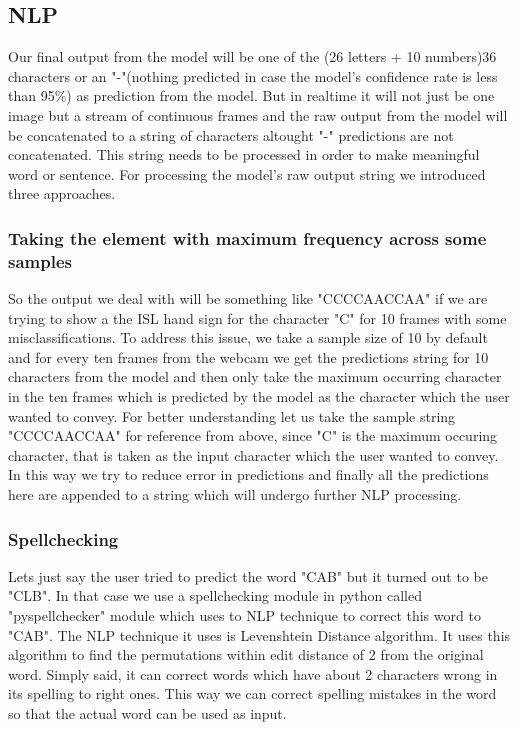 \documentclass[12pt,a4paper]{report}
\begin{document}
\subsection{NLP}
Our final output from the model will be one of the (26 letters + 10 numbers)36 characters or an "-"(nothing predicted in case the model's confidence rate is less than 95\%) as prediction from the model. But in realtime it will not just be one image but a stream of continuous frames and the raw output from the model will be concatenated to a string of characters altought "-" predictions are not concatenated. This string needs to be processed in order to make meaningful word or sentence. For processing the model's raw output string we introduced three approaches.

\subsubsection{Taking the element with maximum frequency across some samples}
So the output we deal with will be something like "CCCCAACCAA" if we are trying to show a the ISL hand sign for the character "C" for 10 frames with some misclassifications. To address this issue, we take a sample size of 10 by default and for every ten frames from the webcam we get the predictions string for 10 characters from the model and then only take the maximum occurring character in the ten frames which is predicted by the model as the character which the user wanted to convey. For better understanding let us take the sample string "CCCCAACCAA" for reference from above, since "C" is the maximum occuring character, that is taken as the input character which the user wanted to convey. In this way we try to reduce error in predictions and finally all the predictions here are appended to a string which will undergo further NLP processing.

\subsubsection{Spellchecking}
Lets just say the user tried to predict the word "CAB" but it turned out to be "CLB". In that case we use a spellchecking module in python called "pyspellchecker" module which uses to NLP technique to correct this word to "CAB". The NLP technique it uses is Levenshtein Distance algorithm. It uses this algorithm to find the permutations within edit distance of 2 from the original word. Simply said, it can correct words which have about 2 characters wrong in its spelling to right ones. This way we can correct spelling mistakes in the word so that the actual word can be used as input.
\end{document}
